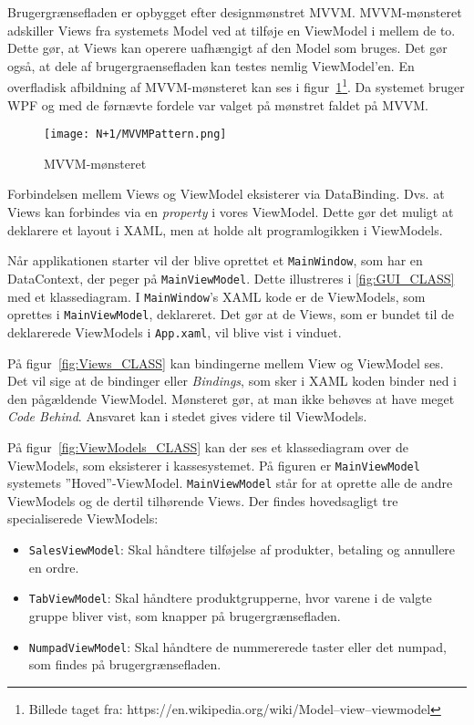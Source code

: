 Brugergrænsefladen er opbygget efter designmønstret \gls{MVVM}\cite{gh:MVVM}. \gls{MVVM}-mønsteret adskiller \gls{View}s fra systemets \gls{Model} ved at tilføje en \gls{ViewModel} i mellem de to. Dette gør, at \gls{View}s kan operere uafhængigt af den \gls{Model} som bruges. Det gør også, at dele af \gls{brugergraenseflade}n kan testes nemlig \gls{ViewModel}'en. En overfladisk afbildning af \gls{MVVM}-mønsteret kan ses i figur~\ref{fig:MVVM}\footnote{Billede taget fra: https://en.wikipedia.org/wiki/Model–view–viewmodel}. Da systemet bruger \gls{WPF} og med de førnævte fordele var valget på mønstret faldet på \gls{MVVM}.

\begin{figure}[H]
\centering
\texttt{[image: N+1/MVVMPattern.png]}
\caption{MVVM-mønsteret}
\label{fig:MVVM}
\end{figure}

Forbindelsen mellem \gls{View}s og \gls{ViewModel} eksisterer via DataBinding. Dvs. at \gls{View}s kan forbindes via en \textit{property} i vores \gls{ViewModel}. Dette gør det muligt at deklarere et layout i \gls{XAML}, men at holde alt programlogikken i \gls{ViewModel}s.


Når applikationen starter vil der blive oprettet et \texttt{MainWindow}, som har en DataContext, der peger på \texttt{MainViewModel}. Dette illustreres i \ref{fig:GUI_CLASS} med et klassediagram. I \texttt{MainWindow}'s \gls{XAML} kode er de \gls{ViewModel}s, som oprettes i \texttt{MainViewModel}, deklareret. Det gør at de \gls{View}s, som er bundet til de deklarerede \gls{ViewModel}s i \texttt{App.xaml}, vil blive vist i vinduet.


På figur~\ref{fig:Views_CLASS} kan bindingerne mellem \gls{View} og \gls{ViewModel} ses. Det vil sige at de bindinger eller \textit{Bindings}, som sker i \gls{XAML} koden binder ned i den pågældende \gls{ViewModel}. Mønsteret gør, at man ikke behøves at have meget \textit{Code Behind}. Ansvaret kan i stedet gives videre til \gls{ViewModel}s.


På figur~\ref{fig:ViewModels_CLASS} kan der ses et klassediagram over de \gls{ViewModel}s, som eksisterer i kassesystemet. På figuren er \texttt{MainViewModel} systemets ''Hoved''-\gls{ViewModel}. \texttt{MainViewModel} står for at oprette alle de andre \gls{ViewModel}s og de dertil tilhørende \gls{View}s. Der findes hovedsagligt tre specialiserede \gls{ViewModel}s:
\begin{itemize}
	\item \texttt{SalesViewModel}: Skal håndtere tilføjelse af produkter, betaling og annullere en ordre.
	\item \texttt{TabViewModel}: Skal håndtere produktgrupperne, hvor varene i de valgte gruppe bliver vist, som knapper på brugergrænsefladen.
	\item \texttt{NumpadViewModel}: Skal håndtere de nummererede taster eller det numpad, som findes på brugergrænsefladen.
\end{itemize}

